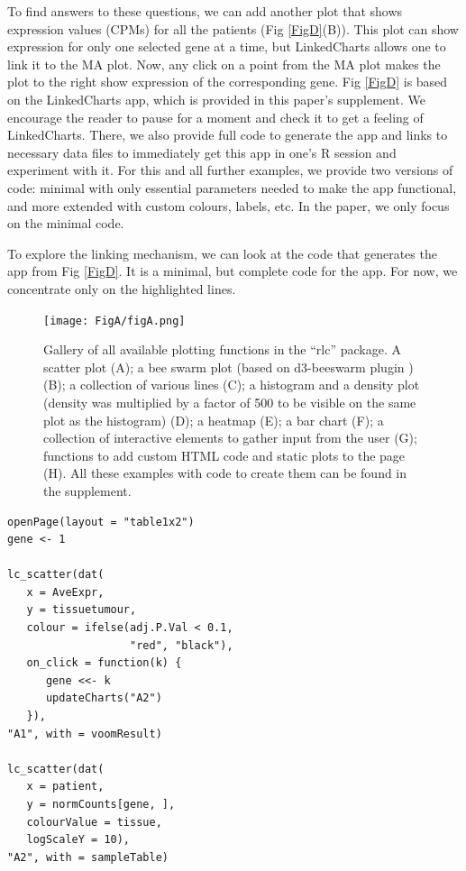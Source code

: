 \documentclass[twocolumn,10pt]{article}
\begin{document}
To find answers to these questions, we can add another plot that shows expression values (CPMs) for all the patients (Fig \ref{FigD}(B)). This plot can show expression for only one selected gene at a time, but LinkedCharts allows one to link it to the MA plot. Now, any click on a point from the MA plot makes the plot to the right show expression of the corresponding gene. Fig \ref{FigD} is based on the LinkedCharts app, which is provided in this paper's supplement. We encourage the reader to pause for a moment and check it to get a feeling of LinkedCharts. There, we also provide full code to generate the app and links to necessary data files to immediately get this app in one's R session and experiment with it. For this and all further examples, we provide two versions of code: minimal with only essential parameters needed to make the app functional, and more extended with custom colours, labels, etc. In the paper, we only focus on the minimal code.

To  explore the linking mechanism, we can look at the code that generates the app from Fig \ref{FigD}. It is a minimal, but complete code for the app. For now, we concentrate only on the highlighted lines.

\begin{figure}[b]
	\texttt{[image: FigA/figA.png]}
	\caption{Gallery of all available plotting functions in the ``rlc'' package. A scatter plot (A); a bee swarm plot (based on d3-beeswarm plugin \citep{lebeau_2017}) (B); a collection of various lines (C); a histogram and a density plot (density was multiplied by a factor of 500 to be visible on the same plot as the histogram) (D); a heatmap (E); a bar chart (F); a collection of interactive elements to gather input from the user (G); functions to add custom HTML code and static plots to the page (H). All these examples with code to create them can be found in the supplement.}
	\label{FigA}
\end{figure}

\begin{verbatim}
openPage(layout = "table1x2")
gene <- 1

lc_scatter(dat(
   x = AveExpr,
   y = tissuetumour,
   colour = ifelse(adj.P.Val < 0.1, 
                   "red", "black"),
   on_click = function(k) {
      gene <<- k
      updateCharts("A2")
   }),
"A1", with = voomResult)

lc_scatter(dat(
   x = patient,
   y = normCounts[gene, ],
   colourValue = tissue, 
   logScaleY = 10),
"A2", with = sampleTable)
\end{verbatim}
\end{document}
